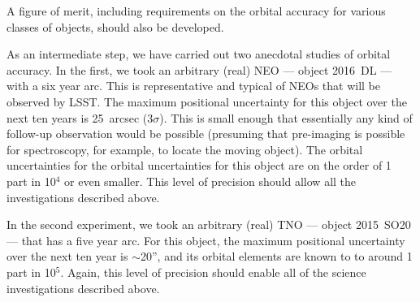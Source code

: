 A figure of merit, including requirements on the orbital accuracy for
various classes of objects, should also be developed.

As an intermediate step, we have carried out two anecdotal studies
of orbital accuracy. In the first,
we took an arbitrary (real) NEO --- object 2016~DL ---
with a six year arc. This is representative
and typical of NEOs that will be observed
by LSST.
The maximum positional uncertainty for this object
over the next ten years
is 25~arcsec (3$\sigma$). This is small enough
that essentially any kind of follow-up observation would be
possible (presuming that pre-imaging is possible
for spectroscopy, for example, to locate the moving
object).
The orbital uncertainties for the orbital uncertainties
for this object are on the order of 
1 part in 10$^4$ or even smaller. This level of 
precision should allow all the investigations described
above.

In the second experiment, we took an arbitrary
(real) TNO --- object 2015~SO20 ---
that has a five year arc.
For this object, the maximum positional uncertainty
over the next ten year is $\sim$20'', and its orbital 
elements are known to 
to around 1 part in 10$^5$. Again, this level
of precision should enable all of the science
investigations described above.



\navigationbar

